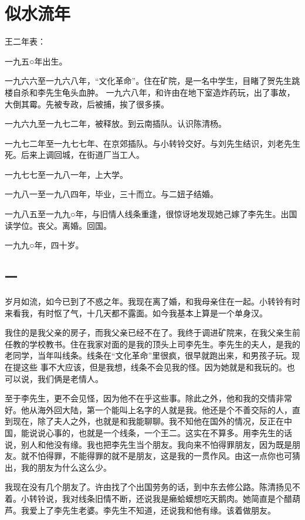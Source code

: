 \chapter{似水流年}

王二年表： 

一九五○年出生。 

一九六六至一九六八年，“文化革命”。住在矿院，是一名中学生，目睹了贺先生跳楼自杀和李先生龟头血肿。 
一九六八年，和许由在地下室造炸药玩，出了事故，大倒其霉。先被专政，后被捕，挨了很多揍。 

一九六九至一九七二年，被释放。到云南插队。认识陈清杨。 

一九七二年至一九七七年、在京郊插队。与小转铃交好。与刘先生结识，刘老先生死。后来上调回城，在街道厂当工人。 

一九七七至一九八一年，上大学。 

一九八一至一九八四年，毕业，三十而立。与二妞子结婚。 

一九八五至一九九○年，与旧情人线条重逢，很惊讶地发现她己嫁了李先生。出国读学位。丧父。离婚。回国。 

一九九○年，四十岁。

\section{一}

岁月如流，如今已到了不惑之年。我现在离了婚，和我母亲住在一起。小转铃有时来看我，有时怄了气，十几天都不露面。如今我基本上算是一个单身汉。 

我住的是我父亲的房子，而我父亲已经不在了。我终于调进矿院来，在我父亲生前任教的学校教书。住在我家对面的是我的顶头上司李先生。李先生的夫人，是我的老同学，当年叫线条。线条在“文化革命”里很疯，很早就跑出来，和男孩子玩。现在提这些 事不大应该，但是我想，线条不会见我的怪。因为她就是和我玩的。也可以说，我们俩是老情人。 

至于李先生，更不会见怪，因为他不在乎这些事。除此之外，他和我的交情非常好。他从海外回大陆，第一个能叫上名字的人就是我。他还是个不善交际的人，直到现在，除了夫人之外，也就是和我能聊聊。我不知他在国外的情况，反正在中国，能说说心事的，也就是一个线条，一个王二。这实在不算多。用李先生的话说，别人和他没有缘。我也把李先生当个朋友。我向来不怕得罪朋友，因为既是朋友。就不怕得罪，不能得罪的就不是朋友，这是我的一贯作风。由这一点你也可猜出，我的朋友为什么这么少。 

我现在没有几个朋友了。许由找了个出国劳务的话，到中东去修公路。陈清扬见不着。小转铃说，我对线条旧情不断，还说我是癞蛤蟆想吃天鹅肉。她简直是个醋葫芦。我爱上了李先生老婆。李先生不知道，还说我和他有缘。该着做朋友。 


